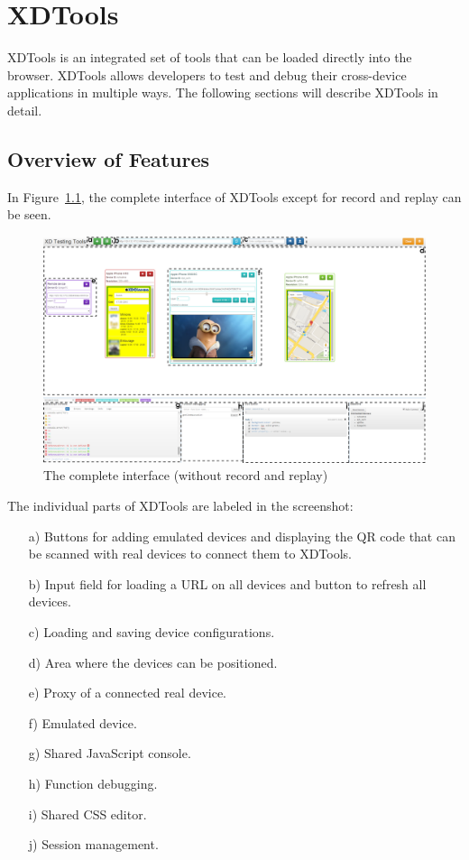 \chapter{XDTools}

XDTools is an integrated set of tools that can be loaded directly into the browser. XDTools allows developers to test and debug their cross-device applications in multiple ways. The following sections will describe XDTools in detail.

\section{Overview of Features}

In Figure~\ref{fig:complete}, the complete interface of XDTools except for record and replay can be seen.

\begin{figure}[H]
  \centering
    \includegraphics[width=1.0\textwidth]{images/screenshots/complete_3.png}
	\caption[Screenshot: Complete Interface]{The complete interface (without record and replay)}
	\label{fig:complete}
\end{figure}

The individual parts of XDTools are labeled in the screenshot:
\begin{itemize}
	\item [a)] Buttons for adding emulated devices and displaying the QR code that can be scanned with real devices to connect them to XDTools.
	\item [b)] Input field for loading a URL on all devices and button to refresh all devices.
	\item [c)] Loading and saving device configurations.
	\item [d)] Area where the devices can be positioned.
	\item [e)] Proxy of a connected real device.
	\item [f)] Emulated device.
	\item [g)] Shared JavaScript console.
	\item [h)] Function debugging.
	\item [i)] Shared CSS editor.
	\item [j)] Session management.
\end{itemize}

